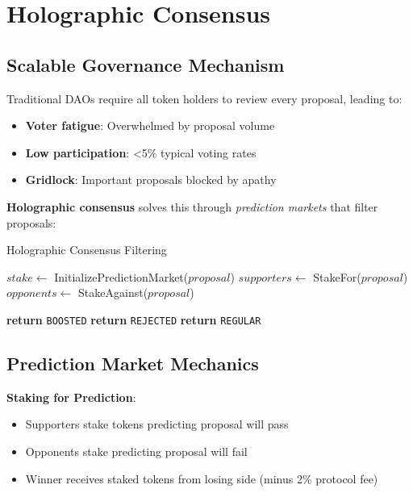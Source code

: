 \documentclass[11pt,a4paper]{article}
\begin{document}
\section{Holographic Consensus}

\subsection{Scalable Governance Mechanism}

Traditional DAOs require all token holders to review every proposal, leading to:
\begin{itemize}
\item \textbf{Voter fatigue}: Overwhelmed by proposal volume
\item \textbf{Low participation}: <5\% typical voting rates
\item \textbf{Gridlock}: Important proposals blocked by apathy
\end{itemize}

\textbf{Holographic consensus} solves this through \emph{prediction markets} that filter proposals:

\begin{algorithm}[H]
\caption{Holographic Consensus Filtering}
\begin{algorithmic}[1]
    \State $stake \gets$ InitializePredictionMarket($proposal$)
    \State $supporters \gets$ StakeFor($proposal$)
    \State $opponents \gets$ StakeAgainst($proposal$)

        \State \textbf{return} \texttt{BOOSTED} 
        \State \textbf{return} \texttt{REJECTED} 
    \Else
        \State \textbf{return} \texttt{REGULAR} 
    \EndIf
\EndFunction
\end{algorithmic}
\end{algorithm}

\subsection{Prediction Market Mechanics}

\textbf{Staking for Prediction}:
\begin{itemize}
\item Supporters stake tokens predicting proposal will pass
\item Opponents stake predicting proposal will fail
\item Winner receives staked tokens from losing side (minus 2\% protocol fee)
\end{itemize}
\end{document}
